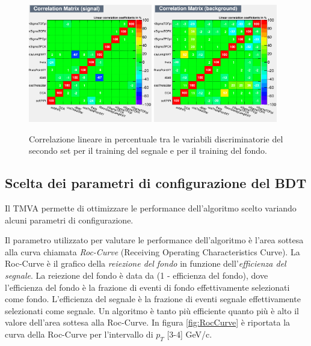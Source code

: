     \begin{figure}[h]
       \centering 
       \includegraphics[width=0.48\textwidth]{training&testing/CorrelationMatrixS.png}
        \includegraphics[width=0.48\textwidth]{training&testing/CorrelationMatrixB.png}
       \caption{Correlazione lineare in percentuale tra le variabili discriminatorie del secondo set per il training del segnale e per il training del fondo.}
       \label{fig:CorrelazioneF}
   \end{figure}
    
    

\subsection{Scelta dei parametri di configurazione del BDT}
Il TMVA permette di ottimizzare le performance dell'algoritmo scelto variando alcuni parametri di configurazione.

Il parametro utilizzato per valutare le performance dell'algoritmo \`e l'area sottesa alla curva chiamata \textit{Roc-Curve} (Receiving Operating Characteristics Curve). La Roc-Curve è il grafico della \textit{reiezione del fondo} in funzione dell'\textit{efficienza del segnale}. La reiezione del fondo è data da (1  -  efficienza del fondo), dove l'efficienza del fondo è la frazione di eventi di fondo effettivamente selezionati come fondo. L'efficienza del segnale è la frazione di eventi segnale effettivamente selezionati come segnale. Un algoritmo è tanto più efficiente quanto più è alto il valore dell'area sottesa alla Roc-Curve.  In figura \ref{fig:RocCurve} è riportata la curva della Roc-Curve per l'intervallo di $p_T$ [3-4] GeV/c. 


